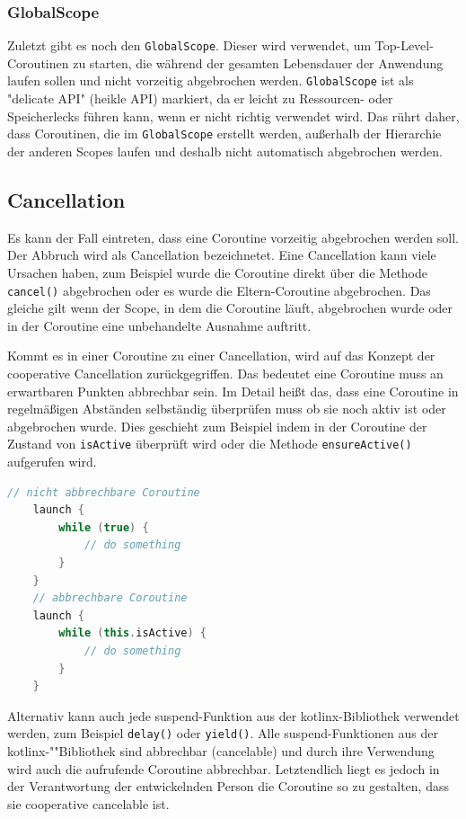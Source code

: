\documentclass[fontsize=12pt,paper=a4,twoside=semi,parskip=half-,headsepline,headinclude]{scrreprt}
\begin{document}
\subsubsection{GlobalScope}

Zuletzt gibt es noch den \texttt{GlobalScope}. Dieser wird verwendet, um Top-Level-Coroutinen zu starten, die während der gesamten Lebensdauer der Anwendung laufen sollen und nicht vorzeitig abgebrochen werden. \texttt{GlobalScope} ist als "delicate API" (heikle API) markiert, da er leicht zu Ressourcen- oder Speicherlecks führen kann, wenn er nicht richtig verwendet wird. Das rührt daher, dass Coroutinen, die im \texttt{GlobalScope} erstellt werden, außerhalb der Hierarchie der anderen Scopes laufen und deshalb nicht automatisch abgebrochen werden.

\subsection{Cancellation}

Es kann der Fall eintreten, dass eine Coroutine vorzeitig abgebrochen werden soll. Der Abbruch wird als Cancellation bezeichnetet. Eine Cancellation kann viele Ursachen haben, zum Beispiel wurde die Coroutine direkt über die Methode \texttt{cancel()} abgebrochen oder es wurde die Eltern-Coroutine abgebrochen. Das gleiche gilt wenn der Scope, in dem die Coroutine läuft, abgebrochen wurde oder in der Coroutine eine unbehandelte Ausnahme auftritt.

Kommt es in einer Coroutine zu einer Cancellation, wird auf das Konzept der cooperative Cancellation\cite{Cancellation2024} zurückgegriffen. Das bedeutet eine Coroutine muss an erwartbaren Punkten abbrechbar sein. Im Detail heißt das, dass eine Coroutine in regelmäßigen Abständen selbständig überprüfen muss ob sie noch aktiv ist oder abgebrochen wurde. Dies geschieht zum Beispiel indem in der Coroutine der Zustand von \texttt{isActive} überprüft wird oder die Methode \texttt{ensureActive()} aufgerufen wird.

\begin{lstlisting}[language=Kotlin]
	// nicht abbrechbare Coroutine
	launch {
		while (true) {
			// do something
		}
	}
	// abbrechbare Coroutine
	launch {
		while (this.isActive) {
			// do something
		}
	}
\end{lstlisting}

Alternativ kann auch jede suspend-Funktion aus der kotlinx-Bibliothek verwendet werden, zum Beispiel \texttt{delay()} oder \texttt{yield()}. Alle suspend-Funktionen aus der kotlinx-""Bibliothek sind abbrechbar (cancelable) und  durch ihre Verwendung wird auch die aufrufende Coroutine abbrechbar. Letztendlich liegt es jedoch in der Verantwortung der entwickelnden Person die Coroutine so zu gestalten, dass sie cooperative cancelable ist.
\end{document}
